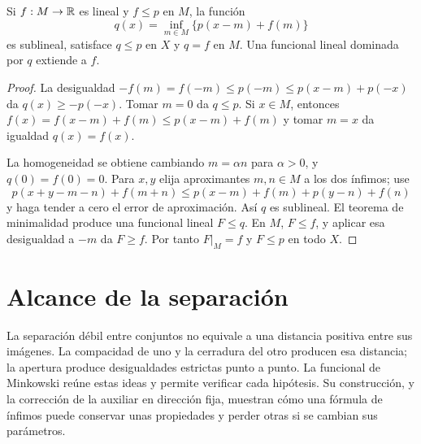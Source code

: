 \begin{proposicion}\label{v3:hb-minimal}
Si $f:M\to\mathbb R$ es lineal y $f\leq p$ en $M$, la función
\[
 q(x)=\inf_{m\in M}\{p(x-m)+f(m)\}
\]
es sublineal, satisface $q\leq p$ en $X$ y $q=f$ en $M$. Una funcional lineal dominada por $q$ extiende a $f$.
\end{proposicion}
\begin{proof}
La desigualdad $-f(m)=f(-m)\leq p(-m)\leq p(x-m)+p(-x)$ da $q(x)\geq-p(-x)$. Tomar $m=0$ da $q\leq p$. Si $x\in M$, entonces $f(x)=f(x-m)+f(m)\leq p(x-m)+f(m)$ y tomar $m=x$ da igualdad $q(x)=f(x)$.

La homogeneidad se obtiene cambiando $m=\alpha n$ para $\alpha>0$, y $q(0)=f(0)=0$. Para $x,y$ elija aproximantes $m,n\in M$ a los dos ínfimos; use
\[
 p(x+y-m-n)+f(m+n)\leq p(x-m)+f(m)+p(y-n)+f(n)
\]
y haga tender a cero el error de aproximación. Así $q$ es sublineal. El teorema de minimalidad produce una funcional lineal $F\leq q$. En $M$, $F\leq f$, y aplicar esa desigualdad a $-m$ da $F\geq f$. Por tanto $F|_M=f$ y $F\leq p$ en todo $X$.
\end{proof}

\section{Alcance de la separación}
La separación débil entre conjuntos no equivale a una distancia positiva entre sus imágenes. La compacidad de uno y la cerradura del otro producen esa distancia; la apertura produce desigualdades estrictas punto a punto. La funcional de Minkowski reúne estas ideas y permite verificar cada hipótesis. Su construcción, y la corrección de la auxiliar en dirección fija, muestran cómo una fórmula de ínfimos puede conservar unas propiedades y perder otras si se cambian sus parámetros.
